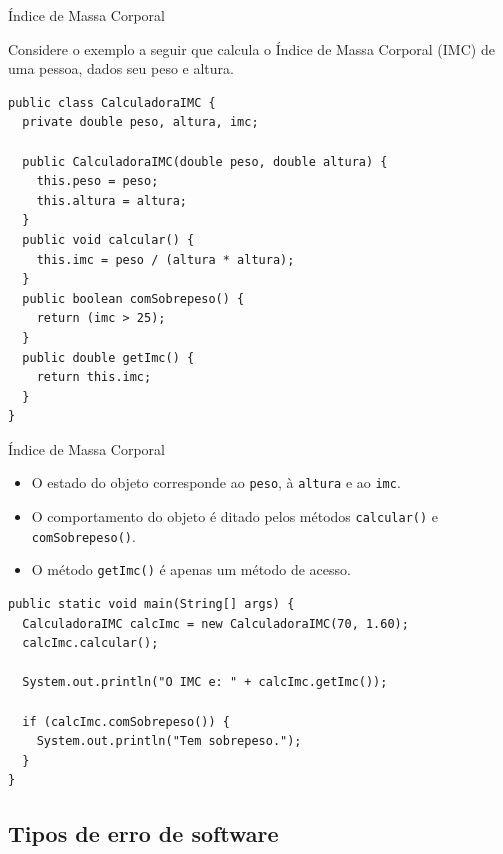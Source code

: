 \documentclass[handout]{beamer}
\begin{document}
\begin{frame}[fragile]{Índice de Massa Corporal}

Considere o exemplo a seguir que calcula o Índice de Massa Corporal (IMC) de uma pessoa, dados seu peso e altura.

\begin{lstlisting}
public class CalculadoraIMC {
  private double peso, altura, imc;
  
  public CalculadoraIMC(double peso, double altura) {
    this.peso = peso;
    this.altura = altura;
  }
  public void calcular() {
    this.imc = peso / (altura * altura);
  }
  public boolean comSobrepeso() {
    return (imc > 25);
  }
  public double getImc() {
    return this.imc;
  }
}
\end{lstlisting}

\end{frame}


\begin{frame}[fragile]{Índice de Massa Corporal}

\begin{itemize}
\item O estado do objeto corresponde ao \lstinline|peso|, à \lstinline|altura| e ao \lstinline|imc|.
\item O comportamento do objeto é ditado pelos métodos \lstinline|calcular()| e \lstinline|comSobrepeso()|.
\item O método \lstinline|getImc()| é apenas um método de acesso.
\end{itemize}

\begin{lstlisting}
public static void main(String[] args) {
  CalculadoraIMC calcImc = new CalculadoraIMC(70, 1.60);
  calcImc.calcular();
    
  System.out.println("O IMC e: " + calcImc.getImc());
 
  if (calcImc.comSobrepeso()) {
    System.out.println("Tem sobrepeso.");
  }
}
\end{lstlisting}

\end{frame}

\subsection{Tipos de erro de software} 
\end{document}
